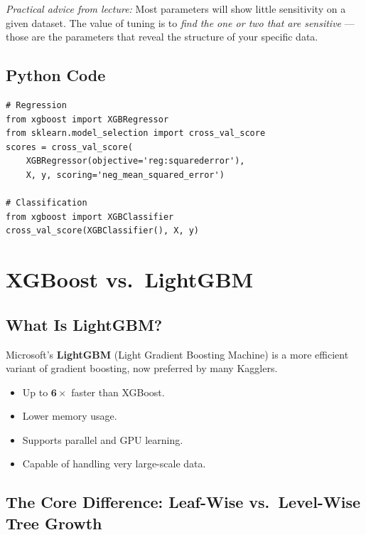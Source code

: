 \documentclass[11pt]{article}
\begin{document}
\textit{Practical advice from lecture:} Most parameters will show little sensitivity
on a given dataset. The value of tuning is to \emph{find the one or two that are
sensitive} --- those are the parameters that reveal the structure of your specific
data.

\subsection{Python Code}

\begin{verbatim}
# Regression
from xgboost import XGBRegressor
from sklearn.model_selection import cross_val_score
scores = cross_val_score(
    XGBRegressor(objective='reg:squarederror'),
    X, y, scoring='neg_mean_squared_error')

# Classification
from xgboost import XGBClassifier
cross_val_score(XGBClassifier(), X, y)
\end{verbatim}

\newpage
\section{XGBoost vs.\ LightGBM}

\subsection{What Is LightGBM?}
Microsoft's \textbf{LightGBM} (Light Gradient Boosting Machine) is a more efficient
variant of gradient boosting, now preferred by many Kagglers.

\begin{itemize}
    \item Up to $\mathbf{6\times}$ faster than XGBoost.
    \item Lower memory usage.
    \item Supports parallel and GPU learning.
    \item Capable of handling very large-scale data.
\end{itemize}

\subsection{The Core Difference: Leaf-Wise vs.\ Level-Wise Tree Growth}
\end{document}
